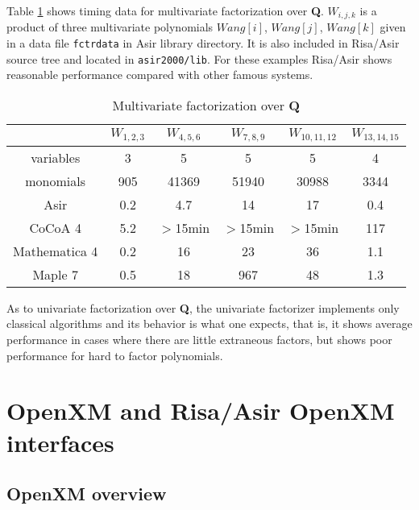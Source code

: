 \documentclass[runningheads]{cl2emult}
\begin{document}
Table \ref{multifac} shows timing data for multivariate
factorization over {\bf Q}.
$W_{i,j,k}$ is a product of three multivariate polynomials 
$Wang[i]$, $Wang[j]$, $Wang[k]$ given in a data file
{\tt fctrdata} in Asir library directory. It is also included
in Risa/Asir source tree and located in {\tt asir2000/lib}.
For these examples Risa/Asir shows reasonable performance
compared with other famous systems. 
\begin{table}[hbtp]
\begin{center}
\begin{tabular}{|c||c|c|c|c|c|} \hline
	& $W_{1,2,3}$ & $W_{4,5,6}$ & $W_{7,8,9}$ & $W_{10,11,12}$ & $W_{13,14,15}$ \\ \hline
variables & 3 & 5 & 5 & 5 & 4 \\ \hline
monomials & 905 & 41369 & 51940 & 30988 & 3344 \\ \hline\hline
Asir 	& 0.2 & 4.7 & 14 & 17 & 0.4 \\ \hline
CoCoA 4 & 5.2 & $>$15min 	& $>$15min & $>$15min & 117 \\ \hline\hline
Mathematica 4& 0.2 	& 16 	& 23 & 36 & 1.1 \\ \hline
Maple 7& 0.5 	& 18 	& 967  & 48 & 1.3 \\ \hline
\end{tabular}
\end{center}
\caption{Multivariate factorization over {\bf Q}}
\label{multifac}
\end{table}
As to univariate factorization over {\bf Q},
the univariate factorizer implements only classical
algorithms and its behavior is what one expects,
that is, it shows average performance in cases
where there are little extraneous factors, but
shows poor performance for hard to factor polynomials.

\section{OpenXM and Risa/Asir OpenXM interfaces}

\subsection{OpenXM overview}
\end{document}
